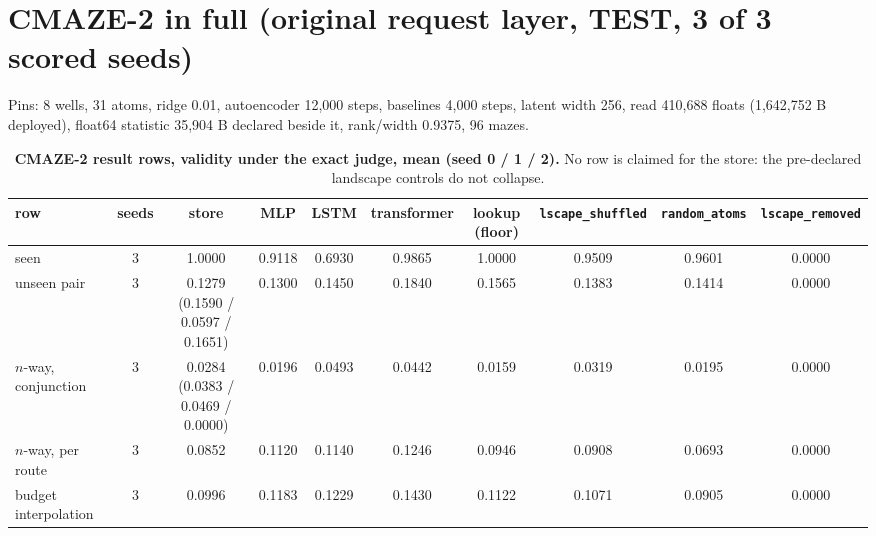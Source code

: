 \documentclass{article} %
\begin{document}
\section{CMAZE-2 in full (original request layer, TEST, 3 of 3 scored seeds)}
\label{app:cmaze2}

Pins: 8 wells, 31 atoms, ridge 0.01, autoencoder 12,000 steps, baselines 4,000 steps, latent width
256, read 410,688 floats (1,642,752 B deployed), float64 statistic 35,904 B declared beside it,
rank/width 0.9375, 96 mazes. %

\begin{table}[h]
\centering\scriptsize
\caption{\textbf{CMAZE-2 result rows, validity under the exact judge, mean (seed 0 / 1 / 2).} No
row is claimed for the store: the pre-declared landscape controls do not collapse.}
\label{tab:cmaze2}
\setlength{\tabcolsep}{1.8pt}
\begin{adjustbox}{max width=\linewidth}\begin{tabular}{lccccccccc}
\toprule
row & seeds & store & MLP & LSTM & transformer & lookup (floor) & \texttt{lscape\_shuffled} & \texttt{random\_atoms} & \texttt{lscape\_removed} \\
\midrule
seen & 3 & 1.0000 & 0.9118 & 0.6930 & 0.9865 & 1.0000 & 0.9509 & 0.9601 & 0.0000 \\
unseen pair & 3 & 0.1279 (0.1590 / 0.0597 / 0.1651) & 0.1300 & 0.1450 & 0.1840 & 0.1565 & 0.1383 & 0.1414 & 0.0000 \\
$n$-way, conjunction & 3 & 0.0284 (0.0383 / 0.0469 / 0.0000) & 0.0196 & 0.0493 & 0.0442 & 0.0159 & 0.0319 & 0.0195 & 0.0000 \\
$n$-way, per route & 3 & 0.0852 & 0.1120 & 0.1140 & 0.1246 & 0.0946 & 0.0908 & 0.0693 & 0.0000 \\
budget interpolation & 3 & 0.0996 & 0.1183 & 0.1229 & 0.1430 & 0.1122 & 0.1071 & 0.0905 & 0.0000 \\
\bottomrule
\end{tabular}\end{adjustbox}
\end{table}
\end{document}
